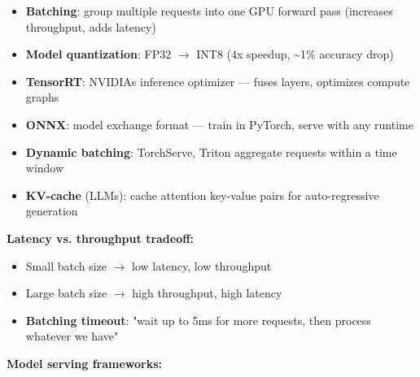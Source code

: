 \documentclass[11pt]{article}
\providecommand{\tightlist}{\setlength{\itemsep}{1pt}\setlength{\parskip}{0pt}}
\begin{document}
\begin{itemize}
\tightlist
\item
  \textbf{Batching}: group multiple requests into one GPU forward pass (increases throughput, adds latency)
\item
  \textbf{Model quantization}: FP32 \(\rightarrow\) INT8 (4x speedup, \textasciitilde1\% accuracy drop)
\item
  \textbf{TensorRT}: NVIDIA\textquotesingle s inference optimizer --- fuses layers, optimizes compute graphs
\item
  \textbf{ONNX}: model exchange format --- train in PyTorch, serve with any runtime
\item
  \textbf{Dynamic batching}: TorchServe, Triton aggregate requests within a time window
\item
  \textbf{KV-cache} (LLMs): cache attention key-value pairs for auto-regressive generation
\end{itemize}

\textbf{Latency vs. throughput tradeoff:}

\begin{itemize}
\tightlist
\item
  Small batch size \(\rightarrow\) low latency, low throughput
\item
  Large batch size \(\rightarrow\) high throughput, high latency
\item
  \textbf{Batching timeout}: "wait up to 5ms for more requests, then process whatever we have"
\end{itemize}

\textbf{Model serving frameworks:}
\end{document}
